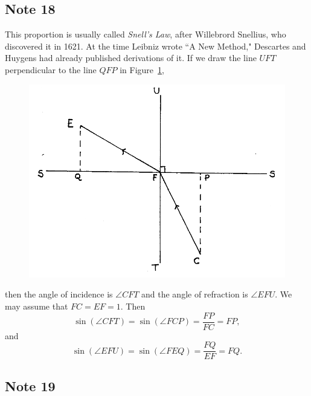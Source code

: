 \documentclass[polutonikogreek,english,twoside,openright]{article}
\begin{document}
\subsection*{Note 18}
\label{cnm18}
This proportion is usually called {\em Snell's Law}, after Willebrord
Snellius, who discovered it in 1621.  At the time Leibniz wrote ``A
New Method," Descartes and Huygens had already published derivations
of it.  If we draw the line $UFT$ perpendicular to the line $QFP$ in
Figure~\ref{Snell},
\begin{figure}[htp]
\begin{center}
\includegraphics[width=.85\textwidth]{fig/Figure23}
\caption{}
\label{Snell}
\vspace{-10pt}
\end{center}
\end{figure}
 then the angle of incidence is $\angle CFT$ and the angle of refraction is $\angle EFU$.  We may assume that $FC = EF = 1$.  Then
$$\sin(\angle CFT) =  \sin(\angle FCP) = \frac{FP}{FC}= FP,$$
and
$$\sin(\angle EFU) =  \sin(\angle FEQ) = \frac{FQ}{EF} = FQ.$$

\subsection*{Note 19}
\label{cnm19}
\end{document}
